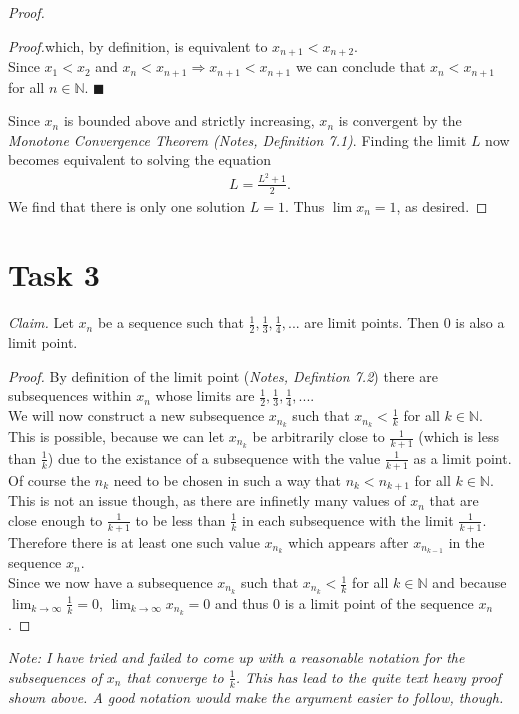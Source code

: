 \documentclass{article}
\newcommand{\N}{\mathbb{N}}
\newenvironment{claimproof}[1]{\par\noindent\emph{Proof.}\space#1}{\hfill $\blacksquare$}
\begin{document}
\begin{proof}
\begin{adjustwidth}{2em}{0pt}
\begin{claimproof}
    which, by definition, is equivalent to $x_{n+1}<x_{n+2}$.\\
    Since $x_1<x_2$ and $x_n<x_{n+1}\Rightarrow x_{n+1}<x_{n+1}$ we can conclude that $x_n<x_{n+1}$ for all $n\in\N$.
  \end{claimproof}
\end{adjustwidth}
Since $x_n$ is bounded above and strictly increasing, $x_n$ is convergent by the \emph{Monotone Convergence Theorem (Notes, Definition 7.1)}. Finding the limit $L$ now becomes equivalent to solving the equation
\begin{align*}
  L=\frac{L^2+1}{2}.
\end{align*}
We find that there is only one solution $L=1$. Thus $\lim x_n=1$, as desired.
\end{proof}
\section*{Task 3}
\emph{Claim.} Let $x_n$ be a sequence such that $\frac{1}{2}, \frac{1}{3}, \frac{1}{4}, ...$ are limit points. Then $0$ is also a limit point.
\begin{proof}
  By definition of the limit point (\emph{Notes, Defintion 7.2}) there are subsequences within $x_n$ whose limits are $\frac{1}{2}, \frac{1}{3}, \frac{1}{4}, ...$. \\
  We will now construct a new subsequence $x_{n_k}$ such that $x_{n_k}<\frac{1}{k}$ for all $k\in\N$.\\
  This is possible, because we can let $x_{n_k}$ be arbitrarily close to $\frac{1}{k+1}$ (which is less than $\frac{1}{k}$) due to the existance of a subsequence with the value $\frac{1}{k+1}$ as a limit point. Of course the $n_k$ need to be chosen in such a way that $n_k<n_{k+1}$ for all $k\in\N$. This is not an issue though, as there are infinetly many values of $x_n$ that are close enough to $\frac{1}{k+1}$ to be less than $\frac{1}{k}$ in each subsequence with the limit $\frac{1}{k+1}$. Therefore there is at least one such value $x_{n_k}$ which appears after $x_{n_{k-1}}$ in the sequence $x_n$.\\
  Since we now have a subsequence $x_{n_k}$ such that $x_{n_k}<\frac{1}{k}$ for all $k\in\N$ and because $\lim_{k\to\infty} \frac{1}{k} = 0$, $\lim_{k\to\infty} x_{n_k}=0$ and thus $0$ is a limit point of the sequence $x_n$.
\end{proof}
\emph{Note: I have tried and failed to come up with a reasonable notation for the subsequences of $x_n$ that converge to $\frac{1}{k}$. This has lead to the quite text heavy proof shown above. A good notation would make the argument easier to follow, though.}
\end{document}
